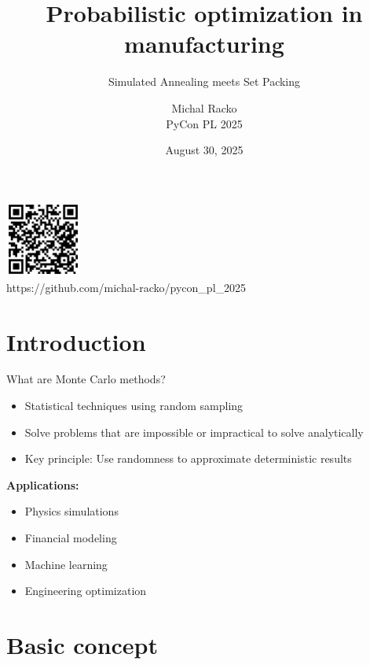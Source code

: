 \documentclass{beamer}
\title{Probabilistic optimization in manufacturing}
\subtitle{Simulated Annealing meets Set Packing}
\author{Michal Racko \\ PyCon PL 2025}
\date{August 30, 2025}
\begin{document}
\begin{frame}
  \titlepage
  \vspace{-0.5cm}
  \begin{center}
    \includegraphics[width=2.5cm]{images/github.png}
    \\[0.2cm]
    \small{https://github.com/michal-racko/pycon\_pl\_2025}
  \end{center}
\end{frame}

\section{Introduction}

\begin{frame}{What are Monte Carlo methods?}
  \begin{itemize}
    \item Statistical techniques using random sampling
    \item Solve problems that are impossible or impractical to solve analytically
    \item Key principle: Use randomness to approximate deterministic results
  \end{itemize}
  
  \vspace{0.5cm}
  \textbf{Applications:}
  \begin{itemize}
    \item Physics simulations
    \item Financial modeling
    \item Machine learning
    \item Engineering optimization
  \end{itemize}
\end{frame}

\section{Basic concept}
\end{document}
